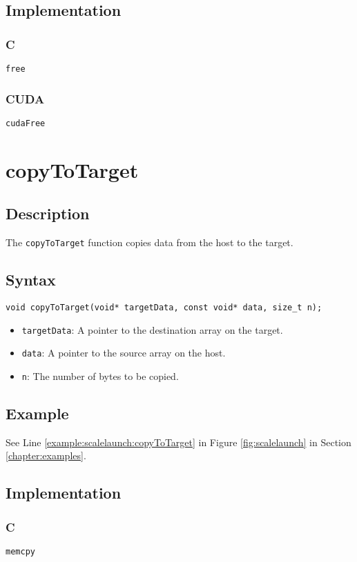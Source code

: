 \subsection{Implementation}
\subsubsection{C}
\verb+free+
\subsubsection{CUDA}
\verb+cudaFree+

\newpage
\section{copyToTarget}

\subsection{Description}

The \verb+copyToTarget+ function copies data from the host to the target.

\subsection{Syntax}
\begin{verbatim}
void copyToTarget(void* targetData, const void* data, size_t n);
\end{verbatim}

\begin{itemize}
\item \verb+targetData+: A pointer to the destination array on the target.
\item \verb+data+: A pointer to the source array on the host.
\item \verb+n+: The number of bytes to be copied.
\end{itemize}


\subsection{Example}
See Line \ref{example:scalelaunch:copyToTarget} in Figure \ref{fig:scalelaunch} in Section \ref{chapter:examples}.

\subsection{Implementation}
\subsubsection{C}
\verb+memcpy+
